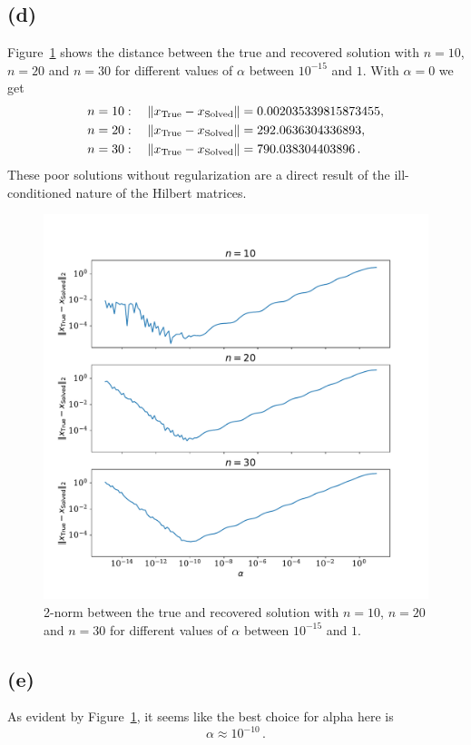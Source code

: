 \documentclass[a4paper, 11pt]{article}
\begin{document}
\subsection*{(d)}
Figure~\ref{fig:result} shows the distance between the true and recovered
solution with $n=10$, $n=20$ and $n=30$ for different values of $\alpha$
between $10^{-15}$ and $1$. With $\alpha = 0$ we get 
\begin{align}
  \begin{split}
    n = 10:\quad\left\Vert x_\textup{True} - x_\textup{Solved}\right\Vert &= 0.002035339815873455, \\
    n = 20:\quad\left\Vert x_\textup{True} - x_\textup{Solved}\right\Vert &= 292.0636304336893, \\
    n = 30:\quad\left\Vert x_\textup{True} - x_\textup{Solved}\right\Vert &= 790.038304403896\,. \\
  \end{split}
\end{align}
These poor solutions without regularization are a direct result of the
ill-conditioned nature of the Hilbert matrices.
\begin{figure}
  \centering
  \includegraphics[width=\textwidth]{../code/hw05_3.pdf}
  \caption{2-norm between the true and recovered solution with $n=10$, $n=20$
  and $n=30$ for different values of $\alpha$ between $10^{-15}$ and $1$.}
  \label{fig:result}
\end{figure}

\subsection*{(e)}
As evident by Figure~\ref{fig:result}, it seems like the best choice for alpha here is
\begin{equation}
  \alpha \approx 10^{-10}\,.
\end{equation}
\end{document}
